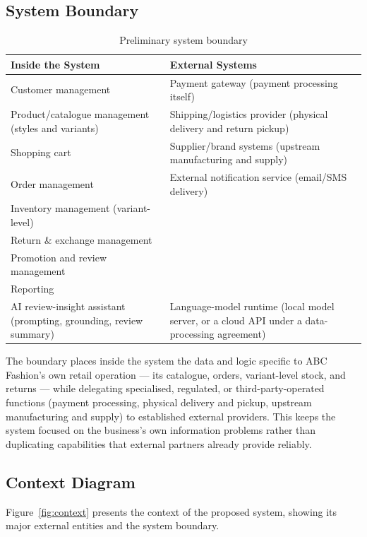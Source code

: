 \documentclass[11pt,a4paper,oneside]{extreport}
\newif\ifshowvtwo
\newcommand{\vtwocolor}{\ifshowvtwo\color{red}\fi}
\newcommand{\R}{\leavevmode\vtwocolor}   %
\begin{document}
\subsection{System Boundary}
\begin{table}[H]
\centering
\caption{Preliminary system boundary}
\label{tab:boundary}
\begin{tabularx}{\textwidth}{@{}Y Y@{}}
\toprule
\textbf{Inside the System} & \textbf{External Systems} \\ \midrule
Customer management & Payment gateway (payment processing itself) \\
Product/catalogue management (styles and variants) & Shipping/logistics provider (physical delivery and return pickup) \\
Shopping cart & Supplier/brand systems (upstream manufacturing and supply) \\
Order management & External notification service (email/SMS delivery) \\
Inventory management (variant-level) & \\
Return \& exchange management & \\
Promotion and review management & \\
Reporting & \\
\R AI review-insight assistant (prompting, grounding, review summary) & \R Language-model runtime (local model server, or a cloud API under a data-processing agreement) \\ \bottomrule
\end{tabularx}
\end{table}

The boundary places inside the system the data and logic specific to ABC Fashion's own retail operation --- its catalogue, orders, variant-level stock, and returns --- while delegating specialised, regulated, or third-party-operated functions (payment processing, physical delivery and pickup, upstream manufacturing and supply) to established external providers. This keeps the system focused on the business's own information problems rather than duplicating capabilities that external partners already provide reliably.

\subsection{Context Diagram}
Figure~\ref{fig:context} presents the context of the proposed system, showing its major external entities and the system boundary.
\end{document}
